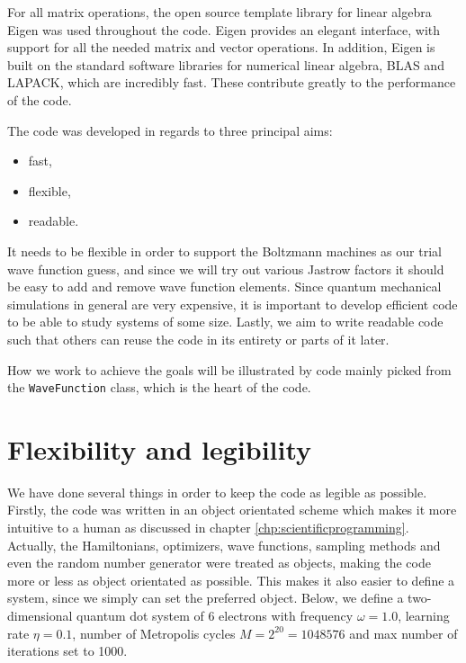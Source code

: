For all matrix operations, the open source template library for linear algebra Eigen was used throughout the code. Eigen provides an elegant interface, with support for all the needed matrix and vector operations. In addition, Eigen is built on the standard software libraries for numerical linear algebra, BLAS and LAPACK, which are incredibly fast. These contribute greatly to the performance of the code. 

The code was developed in regards to three principal aims:
\begin{center}
	\begin{minipage}{0.2\textwidth}
		\begin{itemize}
			\item fast,
			\item flexible,
			\item readable.
		\end{itemize}
	\end{minipage}
\end{center}
It needs to be flexible in order to support the Boltzmann machines as our trial wave function guess, and since we will try out various Jastrow factors it should be easy to add and remove wave function elements. Since quantum mechanical simulations in general are very expensive, it is important to develop efficient code to be able to study systems of some size. Lastly, we aim to write readable code such that others can reuse the code in its entirety or parts of it later. 

How we work to achieve the goals will be illustrated by code mainly picked from the \lstinline{WaveFunction} class, which is the heart of the code.

\section{Flexibility and legibility}
We have done several things in order to keep the code as legible as possible. Firstly, the code was written in an object orientated scheme which makes it more intuitive to a human as discussed in chapter \ref{chp:scientificprogramming}. Actually, the Hamiltonians, optimizers, wave functions, sampling methods and even the random number generator were treated as objects, making the code more or less as object orientated as possible. This makes it also easier to define a system, since we simply can set the preferred object. Below, we define a two-dimensional quantum dot system of 6 electrons with frequency $\omega=1.0$, learning rate $\eta=0.1$, number of Metropolis cycles $M=2^{20}=1048576$ and max number of iterations set to 1000.

